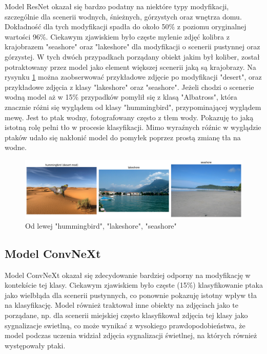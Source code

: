 Model ResNet okazał się bardzo podatny na niektóre typy modyfikacji, szczególnie dla scenerii wodnych, śnieżnych, górzystych oraz wnętrza domu. Dokładność dla tych modyfikacji spadła do około 50\% z poziomu oryginalnej wartości 96\%. Ciekawym zjawiskiem było częste mylenie zdjęć kolibra z krajobrazem "seashore" oraz
"lakeshore" dla modyfikacji o scenerii pustynnej oraz górzystej. W tych dwóch przypadkach porządany obiekt jakim był koliber, został potraktowany przez model jako element większej scenerii jaką są krajobrazy. Na rysynku \ref*{rys:94} można zaobserwować przykładowe zdjęcie po modyfikacji "desert",
oraz przykładowe zdjęcia z klasy "lakeshore" oraz "seashore". Jeżeli chodzi o scenerie wodną model aż w 15\% przypadków pomylił się z klasą "Albatross", która znacznie różni się wyglądem od klasy "hummingbird", przypominającej wyglądem mewę. Jest to ptak wodny, fotografowany często z tłem wody.
Pokazuję to jaką istotną rolę pełni tło w procesie klasyfikacji. Mimo wyraźnych róźnic w wyglądzie ptaków udało się nakłonić model do pomyłek poprzez prostą zmianę tła na wodne.

\begin{figure}
	\centering\includegraphics[width=.9\textwidth]{img/94}
	\caption{Od lewej "hummingbird", "lakeshore", "seashore"}
	\label{rys:94}
\end{figure}

\subsection*{Model ConvNeXt}

Model ConvNeXt okazał się zdecydowanie bardziej odporny na modyfikację w kontekście tej klasy. Ciekawym zjawiskiem było częste (15\%) klasyfikowanie ptaka jako wielbłąda dla scenerii pustynnych, co ponownie pokazuję istotny wpływ tła na klasyfikację. Model również traktował inne obiekty 
na zdjęciach jako te porządane, np. dla scenerii miejskiej często klasyfikował zdjęcia tej klasy jako sygnalizacje swietlną, co może wynikać z wysokiego prawdopodobieństwa, że model podczas uczenia widział zdjęcia sygnalizacji świetlnej, na których również występowały ptaki. 

